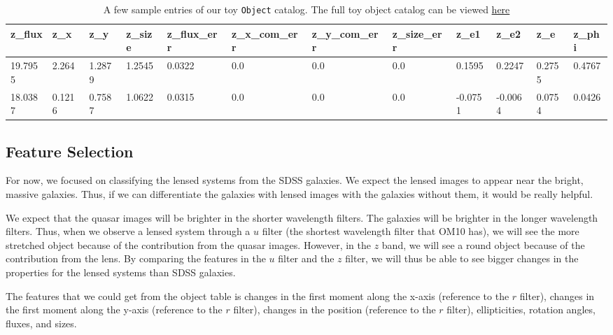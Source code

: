 \documentclass[\docopts]{\docclass}
\def\Object{\texttt{Object}\xspace}
\begin{document}
\begin{table}[!h]
\begin{tabular}{|l|l|l|l|l|l|l|l|l|l|l|l|}
\hline
z\_flux & z\_x   & z\_y   & z\_size & z\_flux\_err & z\_x\_com\_err & z\_y\_com\_err & z\_size\_err & z\_e1   & z\_e2   & z\_e   & z\_phi \\ \hline
19.7955 & 2.264  & 1.2879 & 1.2545  & 0.0322       & 0.0            & 0.0            & 0.0          & 0.1595  & 0.2247  & 0.2755 & 0.4767 \\
18.0387 & 0.1216 & 0.7587 & 1.0622  & 0.0315       & 0.0            & 0.0            & 0.0          & -0.0751 & -0.0064 & 0.0754 & 0.0426 \\ \hline
\end{tabular}

\caption{A few sample entries of our toy \Object catalog. The full toy
object catalog can be viewed
\href{https://www.dropbox.com/s/ob51rxjexzuervl/toy_object_catalog.csv?dl=0}{here}}
\label{tab:object}
\end{table}



\subsection{Feature Selection}
\label{subsec:feature}

For now, we focused on classifying the lensed systems from the SDSS
galaxies. We expect the lensed images to appear near the bright, massive
galaxies. Thus, if we can differentiate the galaxies with lensed images
with the galaxies without them, it would be really helpful.

We expect that the quasar images will be brighter in the shorter
wavelength filters. The galaxies will be brighter in the longer
wavelength filters. Thus, when we observe a lensed system through a $u$
filter (the shortest wavelength filter that OM10 has), we will see the
more stretched object because of the contribution from the quasar
images. However, in the $z$ band, we will see a round object because of
the contribution from the lens. By comparing the features in the $u$
filter and the $z$ filter, we will thus be able to see bigger changes in
the properties for the lensed systems than SDSS galaxies.

The features that we could get from the object table is changes in the
first moment along the x-axis (reference to the $r$ filter), changes in
the first moment along the y-axis (reference to the $r$ filter), changes
in the position (reference to the $r$ filter), ellipticities, rotation
angles, fluxes, and sizes.
\end{document}
